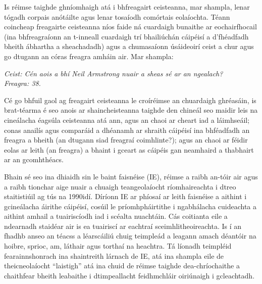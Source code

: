 \documentclass[]{../../metanetpaper}
\begin{document}
\begin{multicols}{2}

Is réimse taighde ghníomhaigh atá i bhfreagairt ceisteanna, mar shampla, lenar tógadh corpais anótáilte agus lenar tosaíodh comórtais eolaíochta. Téann coincheap freagairte ceisteanna níos faide ná cuardaigh bunaithe ar eochairfhocail (ina bhfreagraíonn an t-inneall cuardaigh trí bhailiúchán cáipéisí a d’fhéadfadh bheith ábhartha a sheachadadh) agus a chumasaíonn úsáideoirí ceist a chur agus go dtugann an córas freagra amháin air. Mar shampla:

\textit{Ceist: Cén aois a bhí Neil Armstrong nuair a sheas sé ar an ngealach?}\\
\textit{Freagra: 38.}

Cé go bhfuil gaol ag freagairt ceisteanna le croíréimse an chuardaigh ghréasáin, is brat-téarma é seo anois ar shaincheisteanna taighde den chineál seo maidir leis na cineálacha éagsúla ceisteanna atá ann, agus an chaoi ar cheart iad a láimhseáil; conas anailís agus comparáid a dhéanamh ar shraith cáipéisí ina bhféadfadh an freagra a bheith (an dtugann siad freagraí coimhlinte?); agus an chaoi ar féidir eolas ar leith (an freagra) a bhaint i gceart as cáipéis gan neamhaird a thabhairt ar an gcomhthéacs. 

Bhain sé seo ina dhiaidh sin le baint faisnéise (IE), réimse a raibh an-tóir air agus a raibh tionchar aige nuair a chuaigh teangeolaíocht ríomhaireachta i dtreo staitistiúil ag tús na 1990idí. Díríonn IE ar phíosaí ar leith faisnéise a aithint i gcineálacha áirithe cáipéisí, cosúil le príomhpháirtithe i ngabhálacha cuideachta a aithint amhail a tuairiscíodh iad i scéalta nuachtáin. Cás coitianta eile a ndearnadh staidéar air is ea tuairiscí ar eachtraí sceimhlitheoireachta. Is í an fhadhb anseo an téacss a léarscáiliú chuig teimpleád a leagann amach déantóir na hoibre, sprioc, am, láthair agus torthaí na heachtra. Tá líonadh teimpléid fearainnshonrach ina shaintreith lárnach de IE, atá ina shampla eile de theicneolaíocht ``laistigh'' atá ina chuid de réimse taighde dea-chríochaithe a chaithfear bheith leabaithe i dtimpeallacht feidhmchláir oiriúnaigh i gcleachtadh.


\end{multicols}
\end{document}

